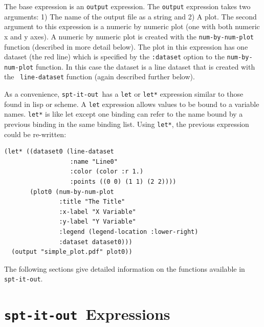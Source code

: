 \documentclass{article}
\newcommand{\sio}{{\tt spt-it-out}}
\begin{document}
The base expression is an {\tt output} expression.  The {\tt output}
expression takes two arguments: 1) The name of the output file as a
string and 2) A plot.  The second argument to this expression is a
numeric by numeric plot (one with both numeric x and y axes).  A
numeric by numeric plot is created with the {\tt num-by-num-plot}
function (described in more detail below).  The plot in this
expression has one dataset (the red line) which is specified by the
{\tt :dataset} option to the {\tt num-by-num-plot} function.  In this
case the dataset is a line dataset that is created with the {\tt
  line-dataset} function (again described further below).

As a convenience, \sio\ has a {\tt let} or {\tt let*} expression
similar to those found in lisp or scheme.  A {\tt let} expression
allows values to be bound to a variable names.  {\tt let*} is like let
except one binding can refer to the name bound by a previous binding
in the same binding list.  Using {\tt let*}, the previous expression
could be re-written:

\begin{verbatim}
(let* ((dataset0 (line-dataset
                  :name "Line0"
                  :color (color :r 1.)
                  :points ((0 0) (1 1) (2 2))))
       (plot0 (num-by-num-plot
               :title "The Title"
               :x-label "X Variable"
               :y-label "Y Variable"
               :legend (legend-location :lower-right)
               :dataset dataset0)))
  (output "simple_plot.pdf" plot0))
\end{verbatim}

The following sections give detailed information on the functions
available in \sio.

\section{\sio\ Expressions}
\end{document}
